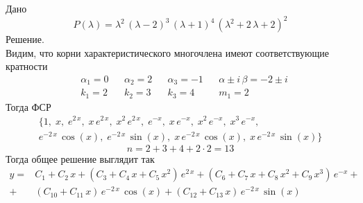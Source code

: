 \begin{Example}
    Дано
    \[
        P(\lambda) = \lambda^2\,(\lambda - 2)^3\,(\lambda + 1)^4\,(\lambda^2 + 2\,\lambda + 2)^2 
    \]
    Решение.\\
    Видим, что корни характеристического многочлена имеют соответствующие кратности
    \begin{align*}
        &\alpha_1 = 0& &\alpha_2 = 2& &\alpha_3 = -1& &\alpha \pm i\,\beta = -2 \pm i\\
        &k_1 = 2& &k_2 = 3& &k_3 = 4& &m_1 = 2
    \end{align*}
    Тогда ФСР
    \begin{multline*}
        \{1,\; x,\; e^{2\,x},\; x\,e^{2\,x},\; x^2\,e^{2\,x},\; e^{-x},\; x\,e^{-x},\; x^2\,e^{-x},\; x^3\,e^{-x},\;\\
        e^{-2\,x}\,\cos(x),\; e^{-2\,x}\,\sin(x),\;  x\,e^{-2\,x}\,\cos(x),\; x\,e^{-2\,x}\,\sin(x)\}
    \end{multline*}
    \[
        n = 2 + 3 + 4 + 2\cdot2 = 13
    \]
    Тогда общее решение выглядит так
    \begin{align*}
        y = &C_1 + C_2\,x + (C_3 + C_4\,x + C_5\,x^2)\,e^{2\,x} + (C_6 + C_7\,x + C_8\,x^2 + C_9\,x^3)\,e^{-x} + \\
        + &(C_{10} + C_{11}\,x)\,e^{-2\,x}\,\cos(x) + (C_{12} + C_{13}\,x)\,e^{-2\,x}\,\sin(x)
    \end{align*}
\end{Example}